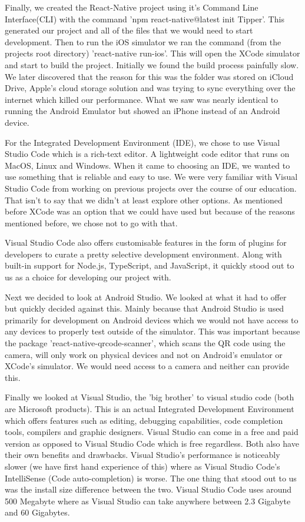 Finally, we created the React-Native project using it's Command Line Interface(CLI)\cite{setUpDevEnviro} with the command 'npm react-native@latest init Tipper'. This generated our project and all of the files that we would need to start development. Then to run the iOS simulator we ran the command (from the projects root directory) 'react-native run-ios'. This will open the XCode simulator\cite{iOSSimulator} and start to build the project. Initially we found the build process painfully slow. We later discovered that the reason for this was the folder was stored on iCloud Drive, Apple's cloud storage solution and was trying to sync everything over the internet which killed our performance. What we saw was nearly identical to running the Android Emulator but showed an iPhone instead of an Android device.

For the Integrated Development Environment (IDE), we chose to use Visual Studio Code which is a rich-text editor. A lightweight code editor that runs on MacOS, Linux and Windows\cite{VSCode}. When it came to choosing an IDE, we wanted to use something that is reliable and easy to use. We were very familiar with Visual Studio Code from working on previous projects over the course of our education. That isn't to say that we didn't at least explore other options. As mentioned before XCode was an option that we could have used but because of the reasons mentioned before, we chose not to go with that.

Visual Studio Code also offers customisable features in the form of plugins for developers to curate a pretty selective development environment. Along with built-in support for Node.js, TypeScript, and JavaScript, it quickly stood out to us as a choice for developing our project with.

Next we decided to look at Android Studio. We looked at what it had to offer but quickly decided against this. Mainly because that Android Studio is used primarily for development on Android devices\cite{meetAndroidStudio} which we would not have access to any devices to properly test outside of the simulator. This was important because the package 'react-native-qrcode-scanner'\cite{npmQrSvg}, which scans the QR code using the camera, will only work on physical devices and not on Android's emulator or XCode's simulator. We would need access to a camera and neither can provide this. 

Finally we looked at Visual Studio, the 'big brother' to visual studio code (both are Microsoft products). This is an actual Integrated Development Environment which offers features such as editing, debugging capabilities, code completion tools, compilers and graphic designers\cite{VS}. Visual Studio can come in a free and paid version as opposed to Visual Studio Code which is free regardless. Both also have their own benefits and drawbacks. Visual Studio's performance is noticeably slower (we have first hand experience of this) where as Visual Studio Code's IntelliSense (Code auto-completion) is worse. The one thing that stood out to us was the install size difference between the two. Visual Studio Code uses around 500 Megabyte\cite{VSCode} where as Visual Studio can take anywhere between 2.3 Gigabyte and 60 Gigabytes\cite{VS}.

